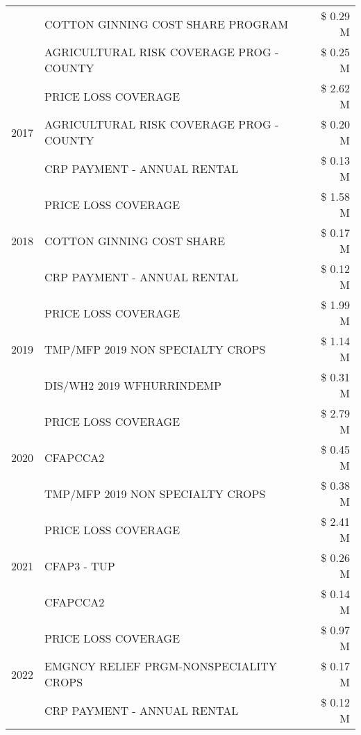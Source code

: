\begin{tabular}{llr}
 & COTTON GINNING COST SHARE PROGRAM & \$ 0.29 M \\
 & AGRICULTURAL RISK COVERAGE PROG - COUNTY & \$ 0.25 M \\
\cline{1-3}
\multirow[t]{3}{*}{2017} & PRICE LOSS COVERAGE & \$ 2.62 M \\
 & AGRICULTURAL RISK COVERAGE PROG - COUNTY & \$ 0.20 M \\
 & CRP PAYMENT - ANNUAL RENTAL & \$ 0.13 M \\
\cline{1-3}
\multirow[t]{3}{*}{2018} & PRICE LOSS COVERAGE & \$ 1.58 M \\
 & COTTON GINNING COST SHARE & \$ 0.17 M \\
 & CRP PAYMENT - ANNUAL RENTAL & \$ 0.12 M \\
\cline{1-3}
\multirow[t]{3}{*}{2019} & PRICE LOSS COVERAGE & \$ 1.99 M \\
 & TMP/MFP 2019 NON SPECIALTY CROPS & \$ 1.14 M \\
 & DIS/WH2 2019 WFHURRINDEMP & \$ 0.31 M \\
\cline{1-3}
\multirow[t]{3}{*}{2020} & PRICE LOSS COVERAGE & \$ 2.79 M \\
 & CFAPCCA2 & \$ 0.45 M \\
 & TMP/MFP 2019 NON SPECIALTY CROPS & \$ 0.38 M \\
\cline{1-3}
\multirow[t]{3}{*}{2021} & PRICE LOSS COVERAGE & \$ 2.41 M \\
 & CFAP3 - TUP & \$ 0.26 M \\
 & CFAPCCA2 & \$ 0.14 M \\
\cline{1-3}
\multirow[t]{3}{*}{2022} & PRICE LOSS COVERAGE & \$ 0.97 M \\
 & EMGNCY RELIEF PRGM-NONSPECIALITY CROPS & \$ 0.17 M \\
 & CRP PAYMENT - ANNUAL RENTAL & \$ 0.12 M \\
\cline{1-3}
\bottomrule
\end{tabular}
